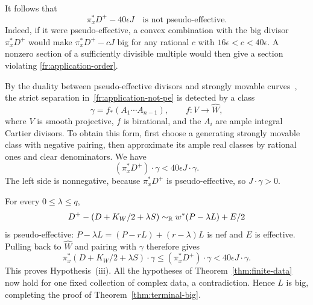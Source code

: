 It follows that
\begin{equation}\label{fr:application-not-pe}
 \pi_x^*D^+-40\epsilon J\quad\text{is not pseudo-effective}.
\end{equation}
Indeed, if it were pseudo-effective, a convex combination with
the big divisor $\pi_x^*D^+$ would make
$\pi_x^*D^+-cJ$ big for any rational $c$ with
$16\epsilon<c<40\epsilon$. A nonzero section of a sufficiently
divisible multiple would then give a section violating
\eqref{fr:application-order}.

By the duality between pseudo-effective divisors and strongly
movable curves~\cite{BDPP}, the strict separation
in~\eqref{fr:application-not-pe} is detected by a class
\[
 \gamma=f_*(A_1\cdots A_{n-1}),
 \qquad f:V\longrightarrow\widehat W,
\]
where $V$ is smooth projective, $f$ is birational, and the $A_i$
are ample integral Cartier divisors. To obtain this form, first
choose a generating strongly movable class with negative pairing,
then approximate its ample real classes by rational ones and
clear denominators. We have
\[
 (\pi_x^*D^+)\cdot\gamma<40\epsilon J\cdot\gamma.
\]
The left side is nonnegative, because $\pi_x^*D^+$ is
pseudo-effective, so $J\cdot\gamma>0$.

For every $0\le\lambda\le q$,
\[
 D^+-(D+K_W/2+\lambda S)
 \sim_{\mathbb R}w^*(P-\lambda L)+E/2
\]
is pseudo-effective: $P-\lambda L=(P-rL)+(r-\lambda)L$ is nef
and $E$ is effective. Pulling back to $\widehat W$ and pairing
with $\gamma$ therefore gives
\[
 \pi_x^*(D+K_W/2+\lambda S)\cdot\gamma
 \le(\pi_x^*D^+)\cdot\gamma
 <40\epsilon J\cdot\gamma.
\]
This proves Hypothesis~\textup{(iii)}. All the hypotheses of
Theorem~\ref{thm:finite-data} now hold for one fixed collection of
complex data, a contradiction. Hence $L$ is big, completing the
proof of Theorem~\ref{thm:terminal-big}.
